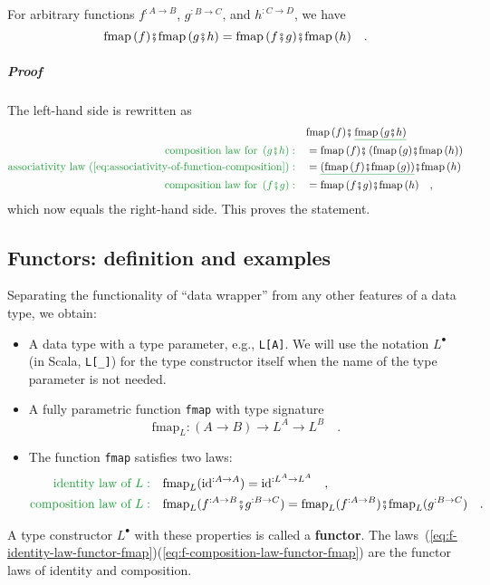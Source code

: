 For arbitrary functions $f^{:A\rightarrow B}$, $g^{:B\rightarrow C}$,
and $h^{:C\rightarrow D}$, we have
\[
\text{fmap}\,(f)\bef\text{fmap}\,(g\bef h)=\text{fmap}\,(f\bef g)\bef\text{fmap}\,(h)\quad.
\]


\subparagraph{Proof}

The left-hand side is rewritten as
\begin{align*}
 & \text{fmap}\,(f)\bef\,\gunderline{\text{fmap}\,(g\bef h)}\\
{\color{greenunder}\text{composition law for }\left(g\bef h\right):}\quad & =\text{fmap}\,(f)\bef\left(\text{fmap}\,(g)\bef\text{fmap}\,(h)\right)\\
{\color{greenunder}\text{associativity law (\ref{eq:associativity-of-function-composition})}:}\quad & =\gunderline{\left(\text{fmap}\,(f)\bef\text{fmap}\,(g)\right)}\bef\text{fmap}\,(h)\\
{\color{greenunder}\text{composition law for }\left(f\bef g\right):}\quad & =\text{fmap}\,(f\bef g)\bef\text{fmap}\,(h)\quad,
\end{align*}
which now equals the right-hand side. This proves the statement.

\subsection{Functors: definition and examples\label{subsec:Functors:-definition-and-examples}}

Separating the functionality of \textsf{``}data wrapper\textsf{''} from any other
features of a data type, we obtain:
\begin{itemize}
\item A data type with a type parameter, e.g., \lstinline!L[A]!. We will
use the notation $L^{\bullet}$ (in Scala, \lstinline!L[_]!) for
the type constructor itself when the name of the type parameter is
not needed.
\item A fully parametric function \lstinline!fmap! with type signature
\[
\text{fmap}_{L}:\left(A\rightarrow B\right)\rightarrow L^{A}\rightarrow L^{B}\quad.
\]
\item The function \lstinline!fmap! satisfies two laws:
\begin{align}
{\color{greenunder}\text{identity law of }L:}\quad & \text{fmap}_{L}(\text{id}^{:A\rightarrow A})=\text{id}^{:L^{A}\rightarrow L^{A}}\quad,\label{eq:f-identity-law-functor-fmap}\\
{\color{greenunder}\text{composition law of }L:}\quad & \text{fmap}_{L}(f^{:A\rightarrow B}\bef g^{:B\rightarrow C})=\text{fmap}_{L}(f^{:A\rightarrow B})\bef\text{fmap}_{L}(g^{:B\rightarrow C})\quad.\label{eq:f-composition-law-functor-fmap}
\end{align}
\end{itemize}
A type constructor $L^{\bullet}$ with these properties is called
a \textbf{functor}. The laws~(\ref{eq:f-identity-law-functor-fmap})\textendash (\ref{eq:f-composition-law-functor-fmap})
are the functor laws of identity and composition. 


